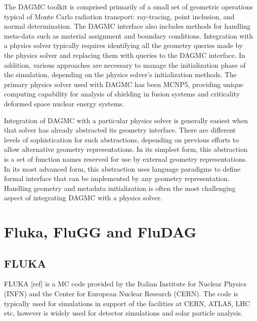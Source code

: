 \documentclass{anstrans}
\begin{document}
The DAGMC toolkit is comprised primarily of a small set of geometric
operations typical of Monte Carlo radiation transport: ray-tracing,
point inclusion, and normal determination.  The DAGMC interface also
includes methods for handling meta-data such as material assignment
and boundary conditions.  Integration with a physics solver typically
requires identifying all the geometry queries made by the physics
solver and replacing them with queries to the DAGMC interface.  In
addition, various approaches are necessary to manage the
initialization phase of the simulation, depending on the physics
solver's initialization methods.  The primary physics solver used with
DAGMC has been MCNP5, providing unique computing capability for
analysis of shielding in fusion systems\cite{fusion3d} and criticality
deformed space nuclear energy systems\cite{nets}.

Integration of DAGMC with a particular physics solver is generally
easiest when that solver has already abstracted its geometry
interface.  There are different levels of sophistication for such
abstractions, depending on previous efforts to allow alternative
geometry representations.  In its simplest form, this abstraction is a
set of function names reserved for use by external geometry
representations.  In its most advanced form, this abstraction uses
language paradigms to define formal interface that can be implemented
by any geometry representation.  Handling geometry and metadata
initialization is often the most challenging aspect of integrating
DAGMC with a physics solver.

\section{Fluka, FluGG and FluDAG}

\subsection{FLUKA}
FLUKA [ref] is a MC code provided by the Italian Institute for Nuclear
Physics (INFN) and the Center for European Nuclear Research (CERN). The
code is typically used for simulations in support of the facilities at   
CERN, ATLAS, LHC etc, however is widely used for detector simulations and 
solar particle analysis. 
\end{document}
